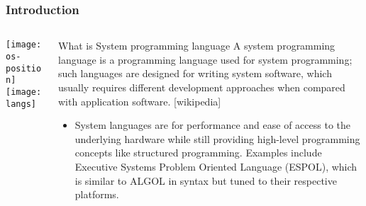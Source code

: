 \begin{frame}[plain]
	\frametitle{Introduction}
	
	
	
	\begin{columns}
		
		\begin{column}{.4\textwidth}
			
			\texttt{[image: os-position]}
			\texttt{[image: langs]}
		\end{column}
		
		\begin{column}{.6\textwidth}
			
			\begin{block}{What is System programming language}
				A system programming language is a programming language used for system programming; such languages are designed for writing system software, which usually requires different development approaches when compared with application software.   [wikipedia]
			\end{block} 
			
			
			\begin{itemize}
				\item System languages are for performance and ease of access to the underlying hardware while still providing high-level programming concepts like structured programming. Examples include  Executive Systems Problem Oriented Language (ESPOL), which is similar to ALGOL in syntax but tuned to their respective platforms. 
				
			\end{itemize}
			
			
		\end{column}
		
		
	\end{columns}
	
	
\end{frame}



